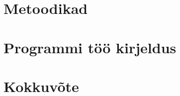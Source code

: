 \documentclass[12pt, a4paper]{report}
\begin{document}
\chapter{Metoodikad}\label{chapter:second_chapter}


\chapter{Programmi töö kirjeldus}\label{chapter:second_chapter}


\chapter{Kokkuvõte}\label{chapter:summary} 


\pagebreak
{}
{}
\printbibliography



\end{document}
